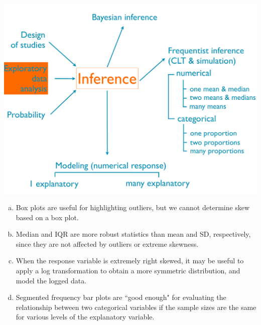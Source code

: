 \documentclass[slidestop,compress,mathserif,12pt,t,professionalfonts,xcolor=table]{beamer}
\newcommand{\solnMult}[1]{#1}
\begin{document}
\begin{frame}

{
{\scriptsize
{}}}
{
 \includegraphics[width=\textwidth]{figures/map/eda}
}

\vfill

{\footnotesize
\begin{enumerate}[(a)]
\item \solnMult{Box plots are useful for highlighting outliers, but we cannot determine skew based on a box plot.}
\item Median and IQR are more robust statistics than mean and SD, respectively, since they are not affected by outliers or extreme skewness.
\item When the response variable is extremely right skewed, it may be useful to apply a log transformation to obtain a more symmetric distribution, and model the logged data.
\item Segmented frequency bar plots are ``good enough" for evaluating the relationship between two categorical variables if the sample sizes are the same for various levels of the explanatory variable.
\end{enumerate}
}

\end{frame}

\end{document}
